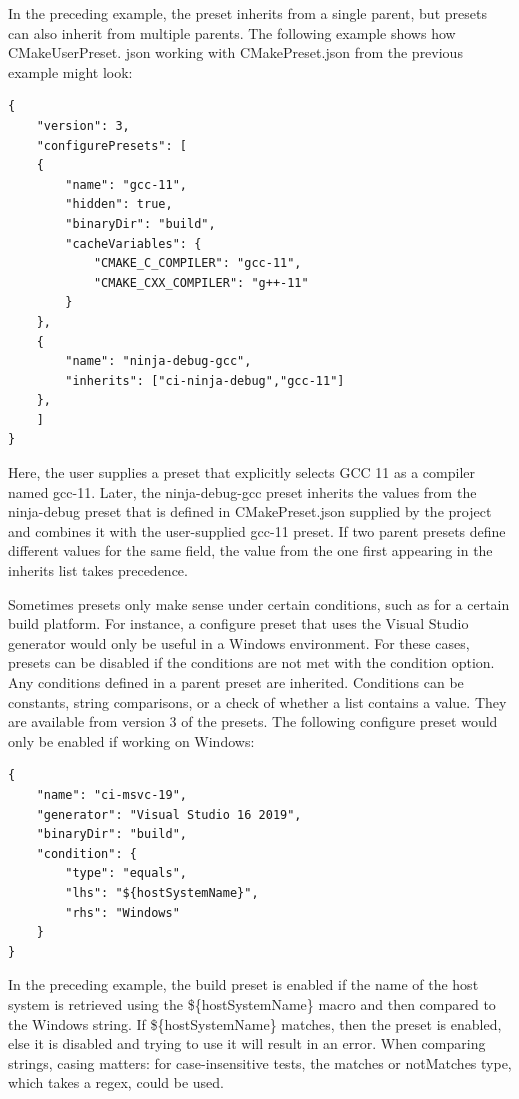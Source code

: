 In the preceding example, the preset inherits from a single parent, but presets can also inherit from multiple parents. The following example shows how CMakeUserPreset. json working with CMakePreset.json from the previous example might look:

\begin{lstlisting}[style=styleCMake]
{
	"version": 3,
	"configurePresets": [
	{
		"name": "gcc-11",
		"hidden": true,
		"binaryDir": "build",
		"cacheVariables": {
			"CMAKE_C_COMPILER": "gcc-11",
			"CMAKE_CXX_COMPILER": "g++-11"
		}
	},
	{
		"name": "ninja-debug-gcc",
		"inherits": ["ci-ninja-debug","gcc-11"]
	},
	]
}
\end{lstlisting}

Here, the user supplies a preset that explicitly selects GCC 11 as a compiler named gcc-11. Later, the ninja-debug-gcc preset inherits the values from the ninja-debug preset that is defined in CMakePreset.json supplied by the project and combines it with the user-supplied gcc-11 preset. If two parent presets define different values for the same field, the value from the one first appearing in the inherits list takes precedence.


Sometimes presets only make sense under certain conditions, such as for a certain build platform. For instance, a configure preset that uses the Visual Studio generator would only be useful in a Windows environment. For these cases, presets can be disabled if the conditions are not met with the condition option. Any conditions defined in a parent preset are inherited. Conditions can be constants, string comparisons, or a check of whether a list contains a value. They are available from version 3 of the presets. The following configure preset would only be enabled if working on Windows:

\begin{lstlisting}[style=styleCMake]
{
	"name": "ci-msvc-19",
	"generator": "Visual Studio 16 2019",
	"binaryDir": "build",
	"condition": {
		"type": "equals",
		"lhs": "${hostSystemName}",
		"rhs": "Windows"
	}
}
\end{lstlisting}

In the preceding example, the build preset is enabled if the name of the host system is retrieved using the \$\{hostSystemName\} macro and then compared to the Windows string. If \$\{hostSystemName\} matches, then the preset is enabled, else it is disabled and trying to use it will result in an error. When comparing strings, casing matters: for case-insensitive tests, the matches or notMatches type, which takes a regex, could be used.

